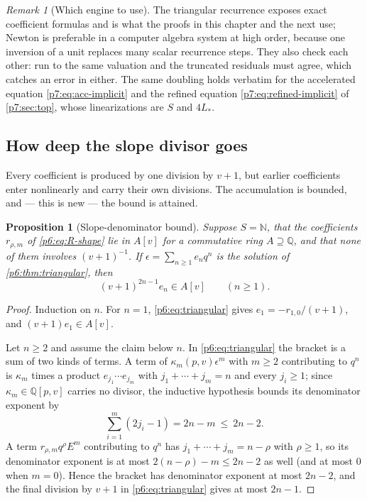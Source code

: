 \documentclass[11pt,a4paper,oneside]{book}
\theoremstyle{plain}
\newtheorem{proposition}[theorem]{Proposition}
\theoremstyle{definition}
\theoremstyle{remark}
\newtheorem{remark}[theorem]{Remark}
\newcommand{\Nat}{\mathbb{N}}
\newcommand{\Rat}{\mathbb{Q}}
\begin{document}
\begin{remark}[Which engine to use]\label{p6:rem:which-engine}
The triangular recurrence exposes exact coefficient formulas and is what the
proofs in this chapter and the next use; Newton is preferable in a computer
algebra system at high order, because one inversion of a unit replaces many
scalar recurrence steps.  They also check each other: run to the same
valuation and the truncated residuals must agree, which catches an error in
either.  The same doubling holds verbatim for the accelerated equation
\eqref{p7:eq:acc-implicit} and the refined equation
\eqref{p7:eq:refined-implicit} of \cref{p7:sec:top}, whose linearizations are
$S$ and $4L_{*}$.
\end{remark}

\subsection{How deep the slope divisor goes}

Every coefficient is produced by one division by $v+1$, but earlier
coefficients enter nonlinearly and carry their own divisions.  The
accumulation is bounded, and --- this is new --- the bound is attained.

\begin{proposition}[Slope-denominator bound]\label{p6:prop:denominator}
Suppose $S=\Nat$, that the coefficients $r_{\rho,m}$ of
\eqref{p6:eq:R-shape} lie in $A[v]$ for a commutative ring $A\supseteq\Rat$,
and that none of them involves $(v+1)^{-1}$.  If
$\epsilon=\sum_{n\ge1}e_nq^{n}$ is the solution of \cref{p6:thm:triangular},
then
\begin{equation}\label{p6:eq:denominator}
 (v+1)^{2n-1}e_n\in A[v]\qquad(n\ge1).
\end{equation}
\end{proposition}

\begin{proof}
Induction on $n$.  For $n=1$, \eqref{p6:eq:triangular} gives
$e_1=-r_{1,0}/(v+1)$, and $(v+1)e_1\in A[v]$.

Let $n\ge2$ and assume the claim below $n$.  In
\eqref{p6:eq:triangular} the bracket is a sum of two kinds of terms.  A term
of $\kappa_m(p,v)\epsilon^{m}$ with $m\ge2$ contributing to $q^{n}$ is
$\kappa_m$ times a product $e_{j_1}\cdots e_{j_m}$ with
$j_1+\cdots+j_m=n$ and every $j_i\ge1$; since $\kappa_m\in\Rat[p,v]$ carries
no divisor, the inductive hypothesis bounds its denominator exponent by
\[
 \sum_{i=1}^{m}(2j_i-1)=2n-m\ \le\ 2n-2 .
\]
A term $r_{\rho,m}q^{\rho}E^{m}$ contributing to $q^{n}$ has
$j_1+\cdots+j_m=n-\rho$ with $\rho\ge1$, so its denominator exponent is at
most $2(n-\rho)-m\le2n-2$ as well (and at most $0$ when $m=0$).  Hence the
bracket has denominator exponent at most $2n-2$, and the final division by
$v+1$ in \eqref{p6:eq:triangular} gives at most $2n-1$.
\end{proof}
\end{document}
